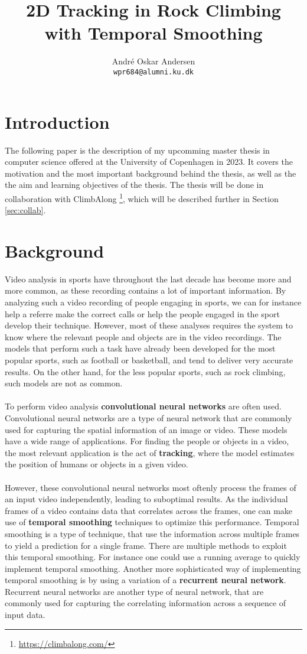 \documentclass[11pt]{article}
\title{2D Tracking in Rock Climbing with Temporal Smoothing}
\author{André Oskar Andersen \\
  \texttt{wpr684@alumni.ku.dk} \\}
\date{}
\begin{document}
\maketitle

\section{Introduction}
The following paper is the description of my upcomming master thesis in computer science offered at the University of Copenhagen in 2023. It covers the motivation and the most important background behind the thesis, as well as the the aim and learning objectives of the thesis. The thesis will be done in collaboration with ClimbAlong \footnote{\url{https://climbalong.com/}}, which will be described further in Section \ref{sec:collab}.

\section{Background}
Video analysis in sports have throughout the last decade has become more and more common, as these recording contains a lot of important information. By analyzing such a video recording of people engaging in sports, we can for instance help a referre make the correct calls or help the people engaged in the sport develop their technique. However, most of these analyses requires the system to know where the relevant people and objects are in the video recordings. The models that perform such a task have already been developed for the most popular sports, such as football or basketball, and tend to deliver very accurate results. On the other hand, for the less popular sports, such as rock climbing, such models are not as common.
\\
\\
To perform video analysis \textbf{convolutional neural networks} are often used. Convolutional neural networks are a type of neural network that are commonly used for capturing the spatial information of an image or video. These models have a wide range of applications. For finding the people or objects in a video, the most relevant application is the act of \textbf{tracking}, where the model estimates the position of humans or objects in a given video.
\\
\\
However, these convolutional neural networks most oftenly process the frames of an input video independently, leading to suboptimal results. As the individual frames of a video contains data that correlates across the frames, one can make use of \textbf{temporal smoothing} techniques to optimize this performance. Temporal smoothing is a type of technique, that use the information across multiple frames to yield a prediction for a single frame. There are multiple methods to exploit this temporal smoothing. For instance one could use a running average to quickly implement temporal smoothing. Another more sophisticated way of implementing temporal smoothing is by using a variation of a \textbf{recurrent neural network}. Recurrent neural networks are another type of neural network, that are commonly used for capturing the correlating information across a sequence of input data.
\end{document}
